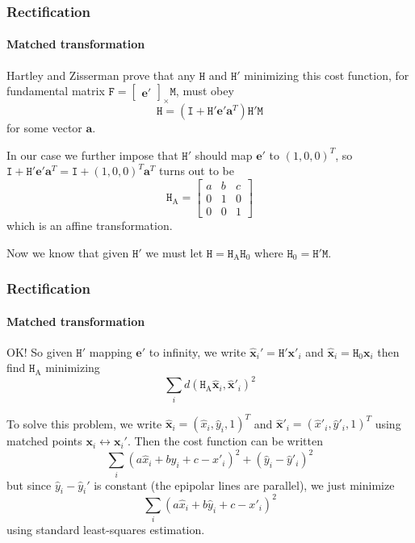 \documentclass[aspectratio=169]{beamer}
\renewcommand{\vec}[1]{\boldsymbol{#1}}
\newcommand{\mat}[1]{\mathtt{#1}}
\newcommand{\crossmat}[1]{\begin{bmatrix} #1 \end{bmatrix}_{\times}}
\begin{document}
\begin{frame}
\frametitle{Rectification}
\framesubtitle{Matched transformation}

Hartley and Zisserman prove that any $\mat{H}$ and $\mat{H}'$
minimizing this cost function, for fundamental matrix
$\mat{F}=\crossmat{\vec{e}'}\mat{M}$, must obey
\begin{equation*}
\mat{H}=(\mat{I}+\mat{H}'\vec{e}'\vec{a}^T)\mat{H}'\mat{M}
\end{equation*}
for some vector $\vec{a}$.

\medskip

In our case we further impose that $\mat{H}'$ should map $\vec{e}'$ to
$(1,0,0)^T$, so $\mat{I}+\mat{H}'\vec{e}'\vec{a}^T =
\mat{I}+(1,0,0)^T\vec{a}^T$ turns out to be
\begin{equation*}
\mat{H}_{\text{A}} = \begin{bmatrix} a & b & c \\ 0 & 1 & 0 \\ 0 & 0 &
1 \end{bmatrix}
\end{equation*}
which is an affine transformation.

\medskip

Now we know that given $\mat{H}'$ we must let
$\mat{H}=\mat{H}_{\text{A}}\mat{H}_0$ where
$\mat{H}_0=\mat{H}'\mat{M}$.

\end{frame}

\begin{frame}
\frametitle{Rectification}
\framesubtitle{Matched transformation}

OK! So given $\mat{H}'$ mapping $\vec{e}'$ to infinity, we write
$\hat{\vec{x}}_i'=\mat{H}'\vec{x}'_i$ and
$\hat{\vec{x}}_i=\mat{H}_0\vec{x}_i$ then find $\mat{H}_{\text{A}}$
minimizing
\begin{equation*}
\sum_i d(\mat{H}_{\text{A}}\hat{\vec{x}}_i,\hat{\vec{x}}'_i)^2
\end{equation*}

\medskip

To solve this problem, we write
$\hat{\vec{x}}_i=(\hat{x}_i,\hat{y}_i,1)^T$ and 
$\hat{\vec{x}}'_i=(\hat{x}'_i,\hat{y}'_i,1)^T$ using matched points
$\vec{x}_i \leftrightarrow \vec{x}_i'$.  Then the cost function can be
written
\begin{equation*}
\sum_i (a\hat{x}_i+b\hat{y}_i+c-x'_i)^2+(\hat{y}_i-\hat{y}'_i)^2
\end{equation*}
but since $\hat{y}_i-\hat{y}_i'$ is constant (the epipolar lines are
parallel), we just minimize
\begin{equation*}
\sum_i (a\hat{x}_i+b\hat{y}_i+c-x'_i)^2
\end{equation*}
using standard least-squares estimation.

\end{frame}
\end{document}
